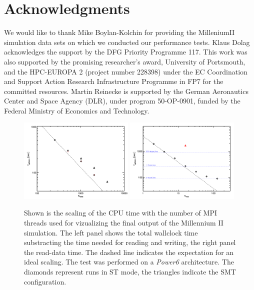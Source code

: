 \documentclass[1p,times]{elsarticle}
\begin{document}
\section*{Acknowledgments}
We would like to thank Mike Boylan-Kolchin for providing the MilleniumII simulation data sets 
on which we conducted our performance tests. 
Klaus Dolag acknowledges the support 
by the DFG Priority Programme 117. This work was also supported by the promising 
researcher's award, University of Portsmouth, and the HPC-EUROPA 2 (project number 228398) 
under the EC Coordination and Support Action Research Infrastructure Programme in FP7 
for the committed resources. Martin Reinecke is supported by the
German Aeronautics Center and Space Agency (DLR), under program 50-OP-0901, funded by the
Federal Ministry of Economics and Technology.


\begin{figure}
\begin{center}
\includegraphics[width=0.49\textwidth]{t_cpu.pdf}
\includegraphics[width=0.49\textwidth]{t_read.pdf}
\end{center}
\caption{Shown is the scaling of the CPU time with the number of MPI threads used 
for vizualizing the
final output of the Millennium II simulation. 
The left panel shows the total wallclock time substracting the time needed for 
reading and writing, the right panel the read-data time. 
The dashed line indicates the expectation for an ideal scaling. The test was 
performed on a {\it Power6} architecture. The diamonds represent runs in ST mode, 
the triangles indicate the SMT configuration.
}\label{cpu_scaling}
\end{figure}
\end{document}

